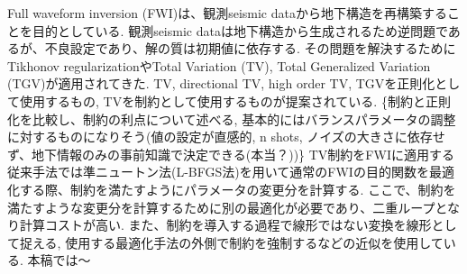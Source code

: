 Full waveform inversion (FWI)\cite{FWI}は、観測seismic dataから地下構造を再構築することを目的としている.
観測seismic dataは地下構造から生成されるため逆問題であるが、不良設定であり、解の質は初期値に依存する.
その問題を解決するためにTikhonov regularization\cite{tikhonov}やTotal Variation (TV)\cite{TV}, Total Generalized Variation (TGV)\cite{TGV}が適用されてきた.
TV, directional TV, high order TV, TGVを正則化として使用するもの\cite{FWI-with-TV-regularization,FWI-with-directional-TV-regularization,FWI-with-high-order-TV-regularization,FWI-with-TGV-regularization}, TVを制約として使用するもの\cite{FWI-with-TV-constraint,FWI-with-TV-constraint2}が提案されている.
\{制約と正則化を比較し、制約の利点について述べる, 基本的にはバランスパラメータの調整に対するものになりそう(値の設定が直感的, n shots, ノイズの大きさに依存せず、地下情報のみの事前知識で決定できる(本当？))\}\cite{constraints-vs-penalties-in-FWI}
TV制約をFWIに適用する従来手法\cite{FWI-with-TV-constraint,FWI-with-TV-constraint2}では準ニュートン法(L-BFGS法)を用いて通常のFWIの目的関数を最適化する際、制約を満たすようにパラメータの変更分を計算する.
ここで、制約を満たすような変更分を計算するために別の最適化が必要であり、二重ループとなり計算コストが高い.
また、制約を導入する過程で線形ではない変換を線形として捉える, 使用する最適化手法の外側で制約を強制するなどの近似を使用している.
本稿では〜




